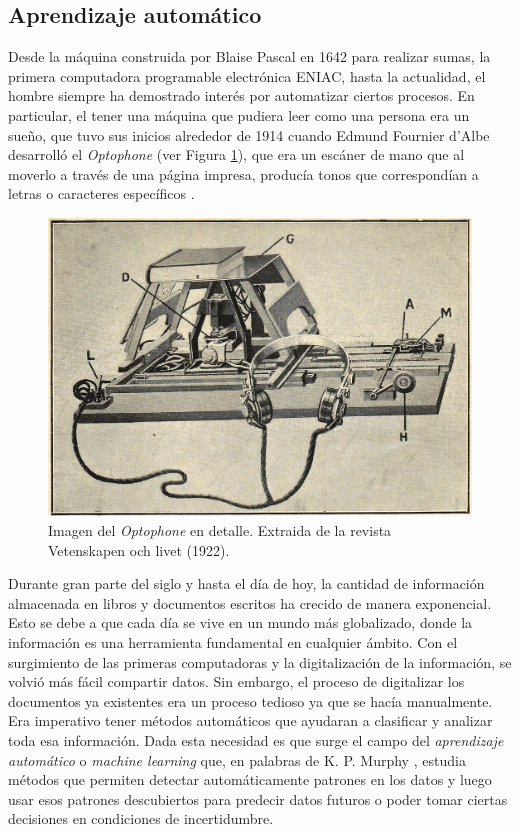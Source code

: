 \subsection{Aprendizaje automático}

	Desde la máquina construida por Blaise Pascal en 1642 para realizar sumas, la primera computadora programable electrónica ENIAC, hasta la actualidad, el hombre siempre ha demostrado interés por automatizar ciertos procesos. En particular, el tener una máquina que pudiera leer como una persona era un sueño, que tuvo sus inicios alrededor de 1914 cuando Edmund Fournier d'Albe desarrolló el \textit{Optophone} (ver Figura \ref{fig: Optophone}), que era un escáner de mano que al moverlo a través de una página impresa, producía tonos que correspondían	a letras o caracteres específicos \cite{EFdAlbe}.

			\begin{figure}[htbp]
				\centering
				\centerline{
					\includegraphics[scale=1]{img/Optophone.jpg}
				}
				\caption[Optophone]{Imagen del \textit{Optophone} en detalle. Extraida de la revista Vetenskapen och livet (1922).}
				\label{fig: Optophone}
			\end{figure}
			
	Durante gran parte del siglo  y hasta el día de hoy, la cantidad de información almacenada en libros y documentos escritos ha crecido de manera exponencial. Esto se debe a que cada día se vive en un mundo más globalizado, donde la información es una herramienta fundamental en cualquier ámbito. Con el surgimiento de las primeras computadoras y la digitalización de la información, se volvió más fácil compartir datos. Sin embargo, el proceso de digitalizar los documentos ya existentes era un proceso tedioso ya que se hacía manualmente. Era imperativo tener métodos automáticos que ayudaran a clasificar y analizar toda esa información. Dada esta necesidad es que surge el campo del \textit{aprendizaje automático} o \textit{machine learning} que, en palabras de K. P. Murphy \cite{Murphy12}, estudia métodos que permiten detectar automáticamente patrones en los datos y luego usar esos patrones descubiertos para predecir datos futuros o poder tomar ciertas decisiones en condiciones de incertidumbre. 
	
